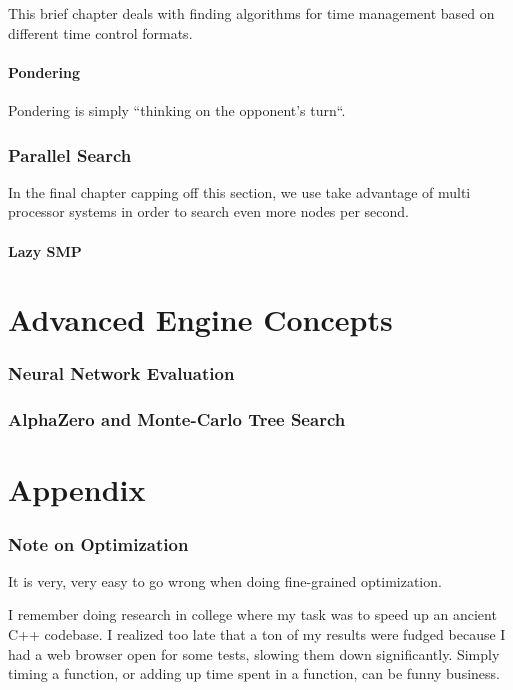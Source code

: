 \documentclass[letterpaper,11pt]{article}
\begin{document}
This brief chapter deals with finding algorithms for time management based on different time control formats.

\subsection{Pondering}

Pondering is simply ``thinking on the opponent's turn``.

\section{Parallel Search}

In the final chapter capping off this section, we use take advantage of multi processor systems in order to 
search even more nodes per second.

\subsection{Lazy SMP}

\newpage
\part{Advanced Engine Concepts}

\section{Neural Network Evaluation}

\section{AlphaZero and Monte-Carlo Tree Search}

\newpage
\part{Appendix}
\section{Note on Optimization}

It is very, very easy to go wrong when doing fine-grained optimization.

I remember doing research in college where my task was to speed up an ancient C++ codebase. I realized too late that a ton of my results were fudged because I had a web browser open for some tests, slowing them down significantly. Simply timing a function, or adding up time spent in a function, can be funny business.
\end{document}
